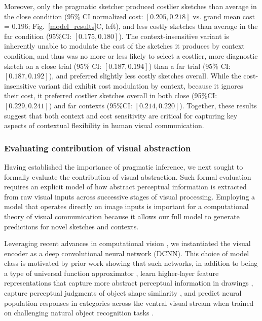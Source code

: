 \documentclass[9pt,twocolumn,twoside]{pnas-new}
\begin{document}
Moreover, only the pragmatic sketcher produced costlier sketches than average in the close condition (95\% CI normalized cost: $[0.205, 0.218]$ vs. grand mean cost = $0.196$; Fig.~\ref{model_results}C, left), and less costly sketches than average in the far condition (95\%CI: $[0.175, 0.180]$). 
The context-insensitive variant is inherently unable to modulate the cost of the sketches it produces by context condition, and thus was no more or less likely to select a costlier, more diagnostic sketch on a close trial (95\% CI: $[0.187, 0.194]$) than a far trial (95\% CI: $[0.187, 0.192]$), and preferred slightly less costly sketches overall. 
While the cost-insensitive variant did exhibit cost modulation by context, because it ignores their cost, it preferred costlier sketches overall in both close (95\%CI: $[0.229, 0.241]$) and far contexts (95\%CI: $[0.214, 0.220]$). 
Together, these results suggest that both context and cost sensitivity are critical for capturing key aspects of contextual flexibility in human visual communication. 

\subsubsection*{Evaluating contribution of visual abstraction}

Having established the importance of pragmatic inference, we next sought to formally evaluate the contribution of visual abstraction.
Such formal evaluation requires an explicit model of how abstract perceptual information is extracted from raw visual inputs across successive stages of visual processing. 
Employing a model that operates directly on image inputs is important for a computational theory of visual communication because it allows our full model to generate predictions for novel sketches and contexts.

Leveraging recent advances in computational vision \cite{FanCommon2018,yamins2014performance}, we instantiated the visual encoder as a deep convolutional neural network (DCNN).
This choice of model class is motivated by prior work showing that such networks, in addition to being a type of universal function approximator \cite{hornik1991approximation}, learn higher-layer feature representations that capture more abstract perceptual information in drawings \cite{FanCommon2018}, capture perceptual judgments of object shape similarity \cite{kubilius2016deep}, and predict neural population responses in categories across the ventral visual stream \cite{yamins2014performance} when trained on challenging natural object recognition tasks \cite{deng2009imagenet}. 
\end{document}
